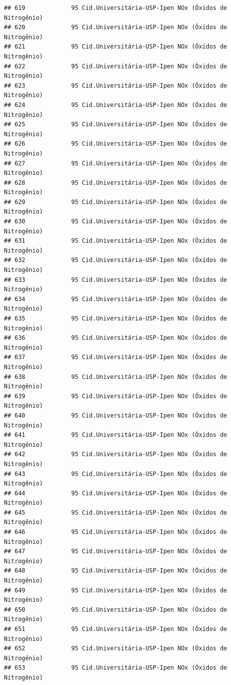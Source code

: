 \documentclass[]{book}
\begin{document}
\begin{verbatim}
## 619             95 Cid.Universitária-USP-Ipen NOx (Óxidos de Nitrogênio)
## 620             95 Cid.Universitária-USP-Ipen NOx (Óxidos de Nitrogênio)
## 621             95 Cid.Universitária-USP-Ipen NOx (Óxidos de Nitrogênio)
## 622             95 Cid.Universitária-USP-Ipen NOx (Óxidos de Nitrogênio)
## 623             95 Cid.Universitária-USP-Ipen NOx (Óxidos de Nitrogênio)
## 624             95 Cid.Universitária-USP-Ipen NOx (Óxidos de Nitrogênio)
## 625             95 Cid.Universitária-USP-Ipen NOx (Óxidos de Nitrogênio)
## 626             95 Cid.Universitária-USP-Ipen NOx (Óxidos de Nitrogênio)
## 627             95 Cid.Universitária-USP-Ipen NOx (Óxidos de Nitrogênio)
## 628             95 Cid.Universitária-USP-Ipen NOx (Óxidos de Nitrogênio)
## 629             95 Cid.Universitária-USP-Ipen NOx (Óxidos de Nitrogênio)
## 630             95 Cid.Universitária-USP-Ipen NOx (Óxidos de Nitrogênio)
## 631             95 Cid.Universitária-USP-Ipen NOx (Óxidos de Nitrogênio)
## 632             95 Cid.Universitária-USP-Ipen NOx (Óxidos de Nitrogênio)
## 633             95 Cid.Universitária-USP-Ipen NOx (Óxidos de Nitrogênio)
## 634             95 Cid.Universitária-USP-Ipen NOx (Óxidos de Nitrogênio)
## 635             95 Cid.Universitária-USP-Ipen NOx (Óxidos de Nitrogênio)
## 636             95 Cid.Universitária-USP-Ipen NOx (Óxidos de Nitrogênio)
## 637             95 Cid.Universitária-USP-Ipen NOx (Óxidos de Nitrogênio)
## 638             95 Cid.Universitária-USP-Ipen NOx (Óxidos de Nitrogênio)
## 639             95 Cid.Universitária-USP-Ipen NOx (Óxidos de Nitrogênio)
## 640             95 Cid.Universitária-USP-Ipen NOx (Óxidos de Nitrogênio)
## 641             95 Cid.Universitária-USP-Ipen NOx (Óxidos de Nitrogênio)
## 642             95 Cid.Universitária-USP-Ipen NOx (Óxidos de Nitrogênio)
## 643             95 Cid.Universitária-USP-Ipen NOx (Óxidos de Nitrogênio)
## 644             95 Cid.Universitária-USP-Ipen NOx (Óxidos de Nitrogênio)
## 645             95 Cid.Universitária-USP-Ipen NOx (Óxidos de Nitrogênio)
## 646             95 Cid.Universitária-USP-Ipen NOx (Óxidos de Nitrogênio)
## 647             95 Cid.Universitária-USP-Ipen NOx (Óxidos de Nitrogênio)
## 648             95 Cid.Universitária-USP-Ipen NOx (Óxidos de Nitrogênio)
## 649             95 Cid.Universitária-USP-Ipen NOx (Óxidos de Nitrogênio)
## 650             95 Cid.Universitária-USP-Ipen NOx (Óxidos de Nitrogênio)
## 651             95 Cid.Universitária-USP-Ipen NOx (Óxidos de Nitrogênio)
## 652             95 Cid.Universitária-USP-Ipen NOx (Óxidos de Nitrogênio)
## 653             95 Cid.Universitária-USP-Ipen NOx (Óxidos de Nitrogênio)

\end{verbatim}
\end{document}
